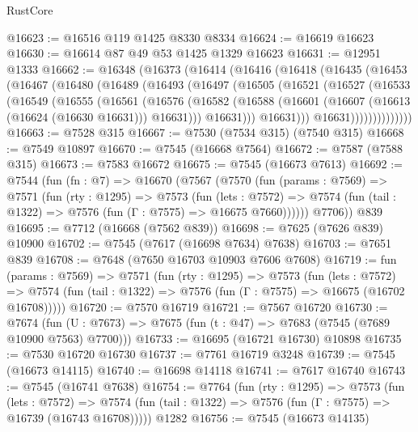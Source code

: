 \begin{lexlean}{RustCore}
\begin{coremodule}
@16623 := @16516 @119 @1425 @8330 @8334
@16624 := @16619 @16623
@16630 := @16614 @87 @49 @53 @1425 @1329 @16623
@16631 := @12951 @1333
@16662 := @16348
    (@16373
      (@16414
        (@16416
          (@16418
            (@16435
              (@16453
                (@16467
                  (@16480
                    (@16489
                      (@16493
                        (@16497
                          (@16505
                            (@16521
                              (@16527
                                (@16533
                                  (@16549
                                    (@16555
                                      (@16561
                                        (@16576
                                          (@16582
                                            (@16588
                                              (@16601
                                                (@16607 (@16613 (@16624 (@16630 @16631))) @16631)))
                                            @16631)))
                                      @16631)))
                                @16631))))))))))))))
@16663 := @7528 @315
@16667 := @7530 (@7534 @315) (@7540 @315)
@16668 := @7549 @10897
@16670 := @7545 (@16668 @7564)
@16672 := @7587 (@7588 @315)
@16673 := @7583 @16672
@16675 := @7545 (@16673 @7613)
@16692 := @7544
    (fun (fn : @7) =>
    @16670
      (@7567
        (@7570
          (fun (params : @7569) =>
          @7571
            (fun (rty : @1295) =>
            @7573
              (fun (lets : @7572) =>
              @7574 (fun (tail : @1322) => @7576 (fun (Γ : @7575) => @16675 @7660))))))
        @7706))
    @839
@16695 := @7712 (@16668 (@7562 @839))
@16698 := @7625 (@7626 @839) @10900
@16702 := @7545 (@7617 (@16698 @7634) @7638)
@16703 := @7651 @839
@16708 := @7648 (@7650 @16703 @10903 @7606 @7608)
@16719 := fun (params : @7569) =>
  @7571
    (fun (rty : @1295) =>
    @7573
      (fun (lets : @7572) =>
      @7574 (fun (tail : @1322) => @7576 (fun (Γ : @7575) => @16675 (@16702 @16708)))))
@16720 := @7570 @16719
@16721 := @7567 @16720
@16730 := @7674
    (fun (U : @7673) => @7675 (fun (t : @47) => @7683 (@7545 (@7689 @10900 @7563) @7700)))
@16733 := @16695 (@16721 @16730) @10898
@16735 := @7530 @16720 @16730
@16737 := @7761 @16719 @3248
@16739 := @7545 (@16673 @14115)
@16740 := @16698 @14118
@16741 := @7617 @16740
@16743 := @7545 (@16741 @7638)
@16754 := @7764
    (fun (rty : @1295) =>
    @7573
      (fun (lets : @7572) =>
      @7574 (fun (tail : @1322) => @7576 (fun (Γ : @7575) => @16739 (@16743 @16708)))))
    @1282
@16756 := @7545 (@16673 @14135)

\end{coremodule}
\end{lexlean}
